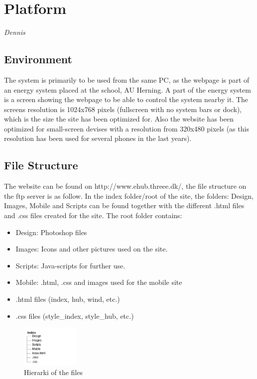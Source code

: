 \newpage
\chapter{Platform} \textit{Dennis}
\section{Environment}
The system is primarily to be used from the same PC, as the webpage is part of an energy system
placed at the school, AU Herning. A part of the energy system is a screen showing the webpage to
be able to control the system nearby it. The screens resolution is 1024x768 pixels (fullscreen with no system bars or dock), 
which is the size the site has been optimized for. Also the website has been optimized for small-screen devises with a resolution from 320x480 pixels (as this resolution has been used for several phones in the last years).
\section{File Structure}
The website can be found on http://www.ehub.threee.dk/, the file structure on the ftp server is as follow. In the index folder/root of the site, the folders: Design, Images, Mobile and Scripts can be found together with the different .html files and .css files created for the site. The root folder contains:
\begin{itemize}
	\item Design: Photoshop files
	\item Images: Icons and other pictures used on the site.
	\item Scripts: Java-scripts for further use.
	\item Mobile: .html, .css and images used for the mobile site
	\item .html files (index, hub, wind, etc.)
	\item .css files (style\_index, style\_hub, etc.)
\end{itemize}
\begin{figure}[htbp]
	\center
	\includegraphics[width=0.25\textwidth]{images/hierarki.png} %
   	\caption{Hierarki of the files}
   	\label{fig:file_hierarki}
\end{figure}
\newpage
